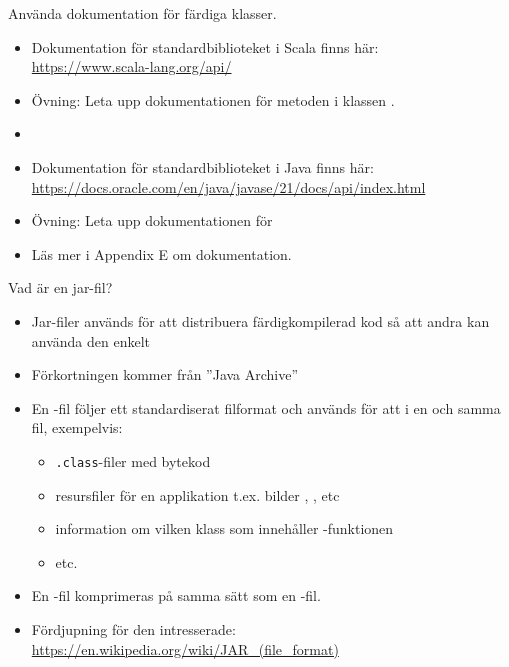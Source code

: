 


\begin{Slide}{Använda dokumentation för färdiga klasser.}
\begin{itemize}
  \item Dokumentation för standardbiblioteket i Scala finns här:  \\ \url{https://www.scala-lang.org/api/}
  \item Övning: Leta upp dokumentationen för metoden  i klassen .
  \item[]
  \item Dokumentation för standardbiblioteket i Java finns här:  \\ 
  \url{https://docs.oracle.com/en/java/javase/21/docs/api/index.html}
  \item Övning: Leta upp dokumentationen för 
  \item Läs mer i Appendix E om dokumentation.

\end{itemize}
\end{Slide}
  

\begin{Slide}{Vad är en jar-fil?}
\begin{itemize}
  \item Jar-filer används för att distribuera färdigkompilerad kod så att andra kan använda den enkelt
  \item Förkortningen  kommer från ''Java Archive''
  \item En -fil följer ett standardiserat filformat och används för att  i en och samma fil, exempelvis:
  \begin{itemize}
    \item \texttt{.class}-filer med bytekod
    \item resursfiler för en applikation t.ex. bilder , , etc
    \item information om vilken klass som innehåller -funktionen
    \item etc.
  \end{itemize}
  \item En -fil komprimeras på samma sätt som en -fil.
  \item Fördjupning för den intresserade:\\
  {\SlideFontTiny\url{https://en.wikipedia.org/wiki/JAR_(file_format)}}
\end{itemize}
\end{Slide}

